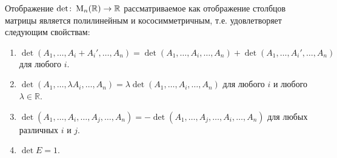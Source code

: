 \begin{claim}\label{claim::DetPolyAnti}
Отображение $\det\colon \operatorname{M}_{n}(\mathbb R)\to \mathbb R$ рассматриваемое как отображение столбцов матрицы является полилинейным и кососимметричным, т.е. удовлетворяет следующим свойствам:
\begin{enumerate}
\item $\det(A_1,\ldots, A_i + A_i', \ldots, A_n) = \det(A_1,\ldots, A_i, \ldots, A_n) + \det(A_1,\ldots,A_i', \ldots, A_n)$ для любого $i$.

\item $\det(A_1,\ldots, \lambda A_i, \ldots, A_n) = \lambda \det(A_1,\ldots, A_i, \ldots, A_n)$ для любого $i$ и любого $\lambda\in\mathbb R$.

\item $\det(A_1,\ldots, A_i, \ldots, A_j, \ldots, A_n) = -\det(A_1,\ldots, A_j, \ldots, A_i, \ldots, A_n)$ для любых различных $i$ и $j$.

\item $\det E = 1$.
\end{enumerate}
\end{claim}

